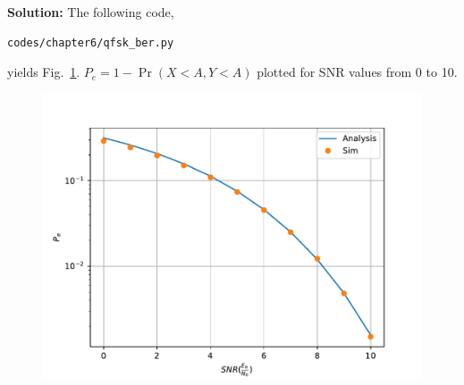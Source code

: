 \documentclass[journal,10pt,twocolumn]{IEEEtran}
\newcommand\figref{Fig.~\ref}
\providecommand{\pr}[1]{\ensuremath{\Pr\left(#1\right)}}
\newcommand{\solution}{\noindent \textbf{Solution: }}
\begin{document}
\begin{enumerate}
\begin{enumerate}[label=(\alph{enumii})]
\solution 
The following code,
\begin{lstlisting}
codes/chapter6/qfsk_ber.py
\end{lstlisting}
yields \figref{fig:qpsk_ber}. $P_e = 1-\pr{X<A,Y<A}$ plotted for SNR values from 0 to 10.
\begin{figure}[H]
\centering
\includegraphics[width=\columnwidth]{./figs/chapter6/qpsk_ber.pdf}
\caption{}
\label{fig:qpsk_ber}
\end{figure}
\end{enumerate}
\end{enumerate}
\end{document}
